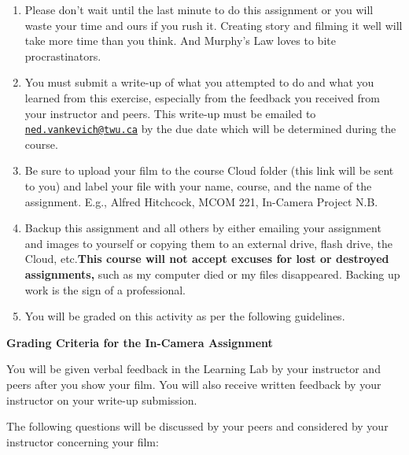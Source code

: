 \documentclass[
]{book}
\begin{document}
\begin{assessment}
\begin{enumerate}
\item
  Please don't wait until the last minute to do this assignment or you will waste your time and ours if you rush it. Creating story and filming it well will take more time than you think. And Murphy's Law loves to bite procrastinators.\\
\item
  You must submit a write-up of what you attempted to do and what you learned from this exercise, especially from the feedback you received from your instructor and peers. This write-up must be emailed to \href{mailto:ned.vankevich@twu.ca}{\nolinkurl{ned.vankevich@twu.ca}} by the due date which will be determined during the course.\\
\item
  Be sure to upload your film to the course Cloud folder (this link will be sent to you) and label your file with your name, course, and the name of the assignment. E.g., Alfred Hitchcock, MCOM 221, In-Camera Project N.B.\\
\item
  Backup this assignment and all others by either emailing your assignment and images to yourself or copying them to an external drive, flash drive, the Cloud, etc.\textbf{This course will not accept excuses for lost or destroyed assignments,} such as my computer died or my files disappeared. Backing up work is the sign of a professional.\\
\item
  You will be graded on this activity as per the following guidelines.
\end{enumerate}

\textbf{Grading Criteria for the In-Camera Assignment}

You will be given verbal feedback in the Learning Lab by your instructor and peers after you show your film. You will also receive written feedback by your instructor on your write-up submission.

The following questions will be discussed by your peers and considered by your instructor concerning your film:


\end{assessment}
\end{document}
